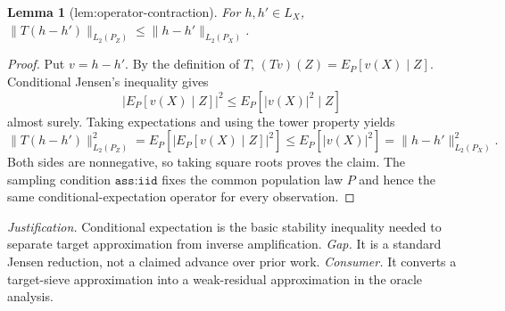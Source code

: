 \documentclass{article}
\newtheorem{lemma}{Lemma}
\begin{document}
\begin{lemma}[lem:operator-contraction]\label{lem:operator-contraction}
For \(h,h'\in L_X\), \(\|T(h-h')\|_{L_2(P_Z)}\le\|h-h'\|_{L_2(P_X)}\).
\end{lemma}
\begin{proof}
Put \(v=h-h'\). By the definition of \(T\), \((Tv)(Z)=E_P[v(X)\mid Z]\). Conditional Jensen's inequality gives
\[
 |E_P[v(X)\mid Z]|^2\le E_P[|v(X)|^2\mid Z]
\]
almost surely. Taking expectations and using the tower property yields
\[
 \|T(h-h')\|_{L_2(P_Z)}^2
 =E_P\!\left[|E_P[v(X)\mid Z]|^2\right]
 \le E_P[|v(X)|^2]
 =\|h-h'\|_{L_2(P_X)}^2.
\]
Both sides are nonnegative, so taking square roots proves the claim. The sampling condition \(\texttt{ass:iid}\) fixes the common population law \(P\) and hence the same conditional-expectation operator for every observation.
\end{proof}
\par\smallskip\noindent \textit{Justification.} Conditional expectation is the basic stability inequality needed to separate target approximation from inverse amplification. \textit{Gap.} It is a standard Jensen reduction, not a claimed advance over prior work. \textit{Consumer.} It converts a target-sieve approximation into a weak-residual approximation in the oracle analysis.
\end{document}
